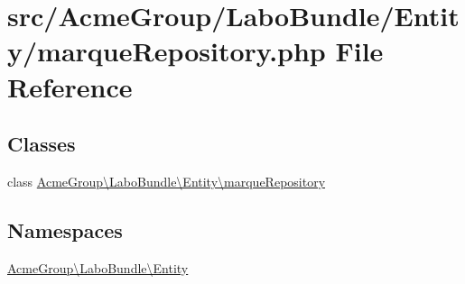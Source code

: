 \hypertarget{marque_repository_8php}{\section{src/\+Acme\+Group/\+Labo\+Bundle/\+Entity/marque\+Repository.php File Reference}
\label{marque_repository_8php}
}
\subsection*{Classes}
\begin{DoxyCompactItemize}
\item 
class \hyperlink{class_acme_group_1_1_labo_bundle_1_1_entity_1_1marque_repository}{Acme\+Group\textbackslash{}\+Labo\+Bundle\textbackslash{}\+Entity\textbackslash{}marque\+Repository}
\end{DoxyCompactItemize}
\subsection*{Namespaces}
\begin{DoxyCompactItemize}
\item 
 \hyperlink{namespace_acme_group_1_1_labo_bundle_1_1_entity}{Acme\+Group\textbackslash{}\+Labo\+Bundle\textbackslash{}\+Entity}
\end{DoxyCompactItemize}
